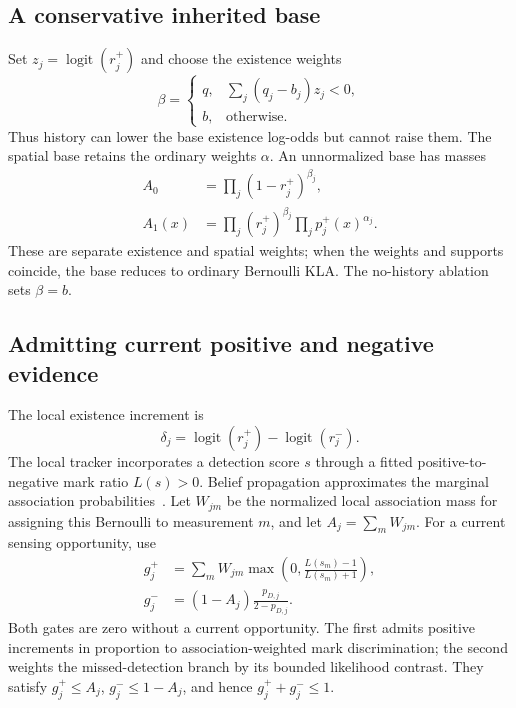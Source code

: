 \subsection{A conservative inherited base}
Set $z_j=\operatorname{logit}(r_j^+)$ and choose the existence weights
\begin{equation}
 \beta=
 \begin{cases}
 q,&\sum_j(q_j-b_j)z_j<0,\\
 b,&\text{otherwise}.
 \end{cases}
 \label{eq:baseweights}
\end{equation}
Thus history can lower the base existence log-odds but cannot raise them.
The spatial base retains the ordinary weights $\alpha$.
An unnormalized base has masses
\begin{align}
 A_0&=\prod_j(1-r_j^+)^{\beta_j},\\
 A_1(x)&=\prod_j(r_j^+)^{\beta_j}
                \prod_jp_j^+(x)^{\alpha_j}.
 \label{eq:base}
\end{align}
These are separate existence and spatial weights; when the weights and
supports coincide, the base reduces to ordinary Bernoulli KLA.
The no-history ablation sets $\beta=b$.

\subsection{Admitting current positive and negative evidence}
The local existence increment is
\begin{equation}
 \delta_j=\operatorname{logit}(r_j^+)
          -\operatorname{logit}(r_j^-).
 \label{eq:increment}
\end{equation}
The local tracker incorporates a detection score $s$ through a fitted
positive-to-negative mark ratio $L(s)>0$. Belief propagation approximates
the marginal association probabilities~\cite{williams2014bp}.
Let $W_{jm}$ be the normalized local association mass for assigning this
Bernoulli to measurement $m$, and let $A_j=\sum_m W_{jm}$.
For a current sensing opportunity, use
\begin{align}
 g_j^+&=\sum_m W_{jm}
       \max\!\left(0,\frac{L(s_m)-1}{L(s_m)+1}\right),
       \label{eq:positivegate}\\
 g_j^-&=(1-A_j)\frac{p_{D,j}}{2-p_{D,j}}.
       \label{eq:negativegate}
\end{align}
Both gates are zero without a current opportunity. The first admits
positive increments in proportion to association-weighted mark
discrimination; the second weights the missed-detection branch by its
bounded likelihood contrast. They satisfy $g_j^+\leq A_j$,
$g_j^-\leq1-A_j$, and hence $g_j^++g_j^-\leq1$.

